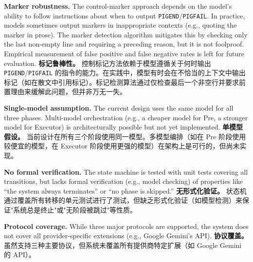 \textbf{Marker robustness.} The control-marker approach depends on the model's ability to follow instructions about when to output \texttt{PIGEND}/\texttt{PIGFAIL}. In practice, models sometimes output markers in inappropriate contexts (e.g., quoting the marker in prose). The marker detection algorithm mitigates this by checking only the last non-empty line and requiring a preceding reason, but it is not foolproof. Empirical measurement of false positive and false negative rates is left for future evaluation.
\textbf{标记鲁棒性。} 控制标记方法依赖于模型遵循关于何时输出 \texttt{PIGEND}/\texttt{PIGFAIL} 的指令的能力。在实践中，模型有时会在不恰当的上下文中输出标记（如在散文中引用标记）。标记检测算法通过仅检查最后一个非空行并要求前置理由来缓解此问题，但并非万无一失。

\textbf{Single-model assumption.} The current design uses the same model for all three phases. Multi-model orchestration (e.g., a cheaper model for Pre, a stronger model for Executor) is architecturally possible but not yet implemented.
\textbf{单模型假设。} 当前设计在所有三个阶段使用同一模型。多模型编排（如在 Pre 阶段使用较便宜的模型，在 Executor 阶段使用更强的模型）在架构上是可行的，但尚未实现。

\textbf{No formal verification.} The state machine is tested with unit tests covering all transitions, but lacks formal verification (e.g., model checking) of properties like ``the system always terminates'' or ``no phase is skipped.''
\textbf{无形式化验证。} 状态机通过覆盖所有转移的单元测试进行了测试，但缺乏形式化验证（如模型检测）来保证"系统总是终止"或"无阶段被跳过"等性质。

\textbf{Protocol coverage.} While three major protocols are supported, the system does not cover all provider-specific extensions (e.g., Google Gemini's API).
\textbf{协议覆盖。} 虽然支持三种主要协议，但系统未覆盖所有提供商特定扩展（如 Google Gemini 的 API）。
